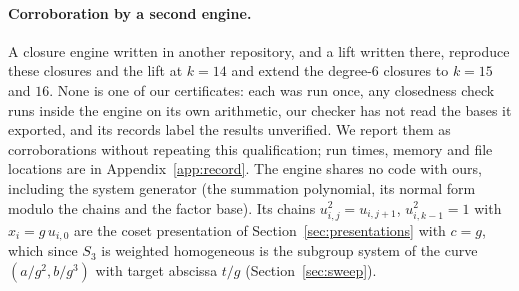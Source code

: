 \documentclass[11pt]{article}
\theoremstyle{definition}\newtheorem{definition}[theorem]{Definition}
\theoremstyle{remark}\newtheorem{remark}[theorem]{Remark}
\begin{document}
\paragraph{Corroboration by a second engine.}
A closure engine written in another repository, and a lift written there,
reproduce these closures and the lift at $k=14$ and extend the degree-$6$
closures to $k=15$ and $16$. None is one of our certificates: each was run
once, any closedness check runs inside the engine on its own arithmetic, our
checker has not read the bases it exported, and its records label the results
unverified. We report them as corroborations without repeating this
qualification; run times, memory and file locations are in
Appendix~\ref{app:record}. The engine shares no code with ours, including the
system generator (the summation polynomial, its normal form modulo the chains
and the factor base). Its chains $u_{i,j}^2=u_{i,j+1}$, $u_{i,k-1}^2=1$ with
$x_i=g\,u_{i,0}$ are the coset presentation of
Section~\ref{sec:presentations} with $c=g$, which since $S_3$ is weighted
homogeneous is the subgroup system of the curve $(a/g^2,b/g^3)$ with target
abscissa $t/g$ (Section~\ref{sec:sweep}).
\end{document}

